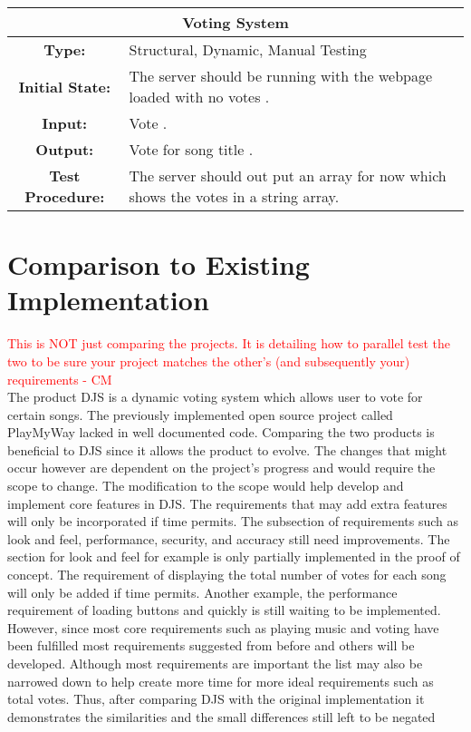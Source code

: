 \documentclass[12pt, titlepage]{article}
\begin{document}
\begin{center}
\begin{table}[H]
\begin{tabularx}{\textwidth}{| c X |}
\hline
\multicolumn{2}{|c|}{\textbf{Voting System}}\\
\hline
\textbf{Type: } & Structural, Dynamic, Manual Testing\\

\textbf{Initial State: } & The server should be running with the webpage loaded with no votes .\\

\textbf{Input: } & Vote .\\

\textbf{Output: } & Vote for song title .\\

\textbf{Test Procedure: } & The server should out put an array for now which shows the votes in a string array. \\
\hline
\end{tabularx}
\end{table}
\end{center}



	
\section{Comparison to Existing Implementation}	
\textcolor{red}{This is NOT just comparing the projects. It is detailing how to parallel test the two to be sure your project matches the other's (and subsequently your) requirements - CM} \\
The product DJS is a dynamic voting system which allows user to vote for certain songs. The previously implemented open source project called PlayMyWay lacked in well documented code. Comparing the two products is beneficial to DJS since it allows the product to evolve. The changes that might occur however are dependent on the project's progress and would require the scope to change. The modification to the scope would help develop and implement core features in DJS. The requirements that may add extra features will only be incorporated if time permits. The subsection of requirements such as look and feel, performance, security, and accuracy still need improvements. The section for look and feel for example is only partially implemented in the proof of concept. The requirement of displaying the total number of votes for each song will only be added if time permits. Another example, the performance requirement of loading buttons and quickly is still waiting to be implemented.  However, since most core requirements such as playing music and voting have been fulfilled most requirements suggested from before and others will be developed. Although most requirements are important  the list may also be narrowed down to help create more time for more ideal requirements such as total votes. Thus, after comparing DJS with the original implementation it demonstrates the similarities and the small differences still left to be negated  
				
\end{document}
